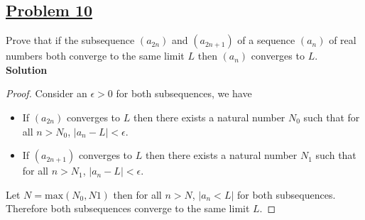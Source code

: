 \documentclass[10pt,letterpaper]{article}
\newcommand{\sol}{\textbf{Solution}}
\begin{document}
	\subsection*{{\color{red}\underline{Problem 10}}}
	Prove that if the subsequence $(a_{2n})$ and $(a_{2n+1})$ of a sequence $(a_n)$ of real numbers both converge
	to the same limit $L$ then $(a_n)$ converges to $L$. \\
	\sol 
	\begin{proof}
	Consider an $\epsilon > 0$ for both subsequences, we have
	\begin{itemize}
		\item If $(a_{2n})$ converges to $L$ then there exists a natural number $N_0$ such that for all $n > N_0$,
		$|a_n - L| < \epsilon$.
		\item If $(a_{2n+1})$ converges to $L$ then there exists a natural number $N_1$ such that for all $n > N_1$,
		$|a_n - L| < \epsilon$.
	\end{itemize}		
	Let $N = \mathrm{max}(N_0, N1)$ then for all $n > N$, $|a_n < L|$ for both subsequences. Therefore both 
	subsequences converge to the same limit $L$.
	
	\end{proof}
	
\end{document}
